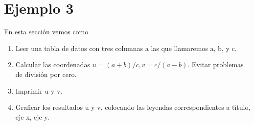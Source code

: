 \section{Ejemplo 3}

En esta secci\'{o}n vemos como 
\begin{enumerate}
\item Leer una tabla de datos con tres columnas a las que llamaremos a, b, y c.
\item Calcular las coordenadas $u = (a + b)/c, v = c / (a - b)$. Evitar problemas de división por cero.
\item Imprimir u y v.
\item Graficar los resultados u y v, colocando las leyendas correspondientes a t\'{\i}tulo, eje x, eje y.
\end{enumerate}


